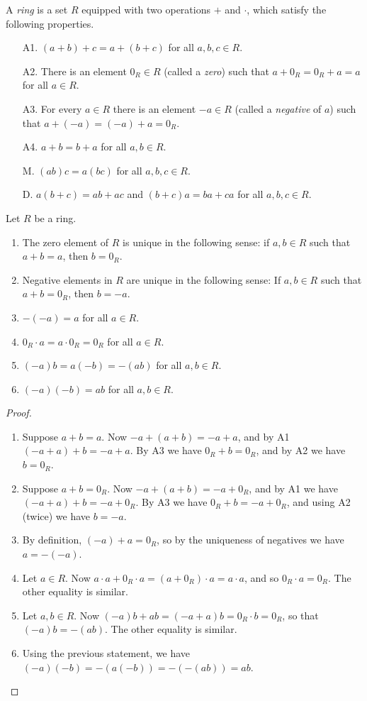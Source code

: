 \documentclass{article}
\begin{document}

\begin{dfn}[Ring]
A \emph{ring} is a set $R$ equipped with two operations $+$ and $\cdot$, which satisfy the following properties.
\begin{itemize}
\item[A1.] $(a+b)+c = a+(b+c)$ for all $a,b,c \in R$.
\item[A2.] There is an element $0_R \in R$ (called a \emph{zero}) such that $a+0_R = 0_R+a = a$ for all $a \in R$.
\item[A3.] For every $a \in R$ there is an element $-a \in R$ (called a \emph{negative} of $a$) such that $a+(-a) = (-a)+a = 0_R$.
\item[A4.] $a + b = b + a$ for all $a,b \in R$.
\item[M.] $(ab)c = a(bc)$ for all $a,b,c \in R$.
\item[D.] $a(b+c) = ab + ac$ and $(b+c)a = ba + ca$ for all $a,b,c \in R$.
\end{itemize}
\end{dfn}

\begin{prop}
Let $R$ be a ring.
\begin{enumerate}
\item The zero element of $R$ is unique in the following sense: if $a,b \in R$ such that $a+b = a$, then $b = 0_R$.
\item Negative elements in $R$ are unique in the following sense: If $a,b \in R$ such that $a+b = 0_R$, then $b = -a$.
\item $-(-a) = a$ for all $a \in R$.
\item $0_R \cdot a = a \cdot 0_R = 0_R$ for all $a \in R$.
\item $(-a)b = a(-b) = -(ab)$ for all $a,b \in R$.
\item $(-a)(-b) = ab$ for all $a,b \in R$.
\end{enumerate}
\end{prop}

\begin{proof} \mbox{}
\begin{enumerate}
\item Suppose $a+b = a$. Now $-a + (a+b) = -a + a$, and by A1 $(-a + a) + b = -a + a$. By A3 we have $0_R + b = 0_R$, and by A2 we have $b = 0_R$.
\item Suppose $a + b = 0_R$. Now $-a + (a+b) = -a + 0_R$, and by A1 we have $(-a+a)+b = -a+0_R$. By A3 we have $0_R + b = -a + 0_R$, and using A2 (twice) we have $b = -a$.
\item By definition, $(-a) + a = 0_R$, so by the uniqueness of negatives we have $a = -(-a)$.
\item Let $a \in R$. Now $a \cdot a + 0_R \cdot a = (a + 0_R) \cdot a = a \cdot a$, and so $0_R \cdot a = 0_R$. The other equality is similar.
\item Let $a,b \in R$. Now $(-a)b + ab = (-a + a)b = 0_R \cdot b = 0_R$, so that $(-a)b = -(ab)$. The other equality is similar.
\item Using the previous statement, we have $(-a)(-b) = -(a(-b)) = -(-(ab)) = ab$.
\end{enumerate}
\end{proof}
\end{document}
